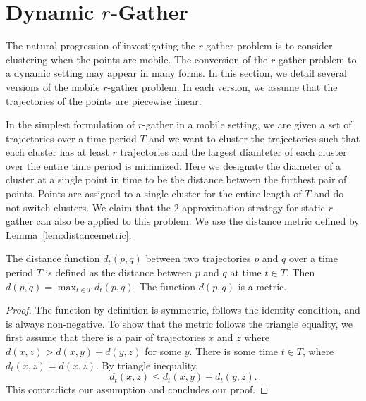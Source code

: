 \section{Dynamic $r$-Gather}

The natural progression of investigating the $r$-gather problem is to consider clustering when the points are mobile.  The conversion of the $r$-gather problem to a dynamic setting may appear in many forms.  In this section, we detail several versions of the mobile $r$-gather problem.  In each version, we assume that the trajectories of the points are piecewise linear.

In the simplest formulation of $r$-gather in a mobile setting, we are given a set of trajectories over a time period $T$ and we want to cluster the trajectories such that each cluster has at least $r$ trajectories and the largest diamteter of each cluster over the entire time period is minimized.  Here we designate the diameter of a cluster at a single point in time to be the distance between the furthest pair of points.  Points are assigned to a single cluster for the entire length of $T$ and do not switch clusters.  We claim that the 2-approximation strategy for static $r$-gather can also be applied to this problem.  
We use the distance metric defined by Lemma~\ref{lem:distancemetric}.  

\begin{lemma}\label{lem:distancemetric}
The distance function $d_t(p,q)$ between two trajectories $p$ and $q$ over a time period $T$ is defined as the distance between $p$ and $q$ at time $t \in T$.  Then $d(p,q) = \max_{t \in T}d_t(p,q)$.  The function $d(p,q)$ is a metric.
\end{lemma}

\begin{proof}
The function by definition is symmetric, follows the identity condition, and is always non-negative.  To show that the metric follows the triangle equality, we first assume that there is a pair of trajectories $x$ and $z$ where $d(x,z) > d(x,y) + d(y,z)$ for some $y$.  There is some time $t \in T$, where $d_t(x,z) = d(x,z)$.  By triangle inequality,
$$d_t(x,z) \leq d_t(x,y) + d_t(y,z).$$
This contradicts our assumption and concludes our proof.
\end{proof}


